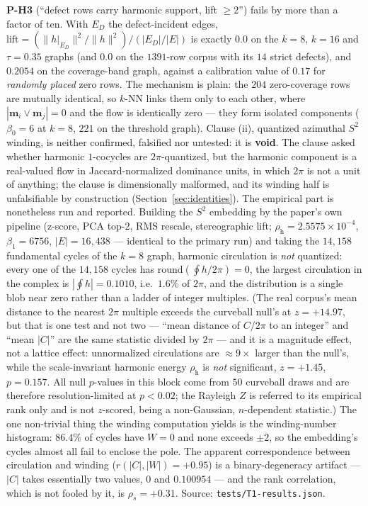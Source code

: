\documentclass[11pt,a4paper]{article}
\theoremstyle{plain}
\theoremstyle{remark}
\theoremstyle{plain}
\begin{document}
\textbf{P-H3} (``defect rows carry harmonic support, lift $\ge2$'') fails by more than a factor of ten. With $E_D$ the defect-incident edges, $\mathrm{lift}=(\|h|_{E_D}\|^2/\|h\|^2)/(|E_D|/|E|)$ is exactly $0.0$ on the $k{=}8$, $k{=}16$ and $\tau{=}0.35$ graphs (and $0.0$ on the $1391$-row corpus with its $14$ strict defects), and $0.2054$ on the coverage-band graph, against a calibration value of $0.17$ for \emph{randomly placed} zero rows. The mechanism is plain: the $204$ zero-coverage rows are mutually identical, so $k$-NN links them only to each other, where $|\mathbf m_i\vee\mathbf m_j|=0$ and the flow is identically zero --- they form isolated components ($\beta_0=6$ at $k{=}8$, $221$ on the threshold graph). Clause (ii), quantized azimuthal $S^2$ winding, is neither confirmed, falsified nor untested: it is \textbf{void}. The clause asked whether harmonic $1$-cocycles are $2\pi$-quantized, but the harmonic component is a real-valued flow in Jaccard-normalized dominance units, in which $2\pi$ is not a unit of anything; the clause is dimensionally malformed, and its winding half is unfalsifiable by construction (Section~\ref{sec:identities}). The empirical part is nonetheless run and reported. Building the $S^2$ embedding by the paper's own pipeline (z-score, PCA top-$2$, RMS rescale, stereographic lift; $\rho_{\mathrm h}=2.5575\times10^{-4}$, $\beta_1=6756$, $|E|=16{,}438$ --- identical to the primary run) and taking the $14{,}158$ fundamental cycles of the $k{=}8$ graph, harmonic circulation is \emph{not} quantized: every one of the $14{,}158$ cycles has $\mathrm{round}(\oint h/2\pi)=0$, the largest circulation in the complex is $|\oint h|=0.1010$, i.e.\ $1.6\%$ of $2\pi$, and the distribution is a single blob near zero rather than a ladder of integer multiples. (The real corpus's mean distance to the nearest $2\pi$ multiple exceeds the curveball null's at $z=+14.97$, but that is one test and not two --- ``mean distance of $C/2\pi$ to an integer'' and ``mean $|C|$'' are the same statistic divided by $2\pi$ --- and it is a magnitude effect, not a lattice effect: unnormalized circulations are $\approx9\times$ larger than the null's, while the scale-invariant harmonic energy $\rho_{\mathrm h}$ is \emph{not} significant, $z=+1.45$, $p=0.157$. All null $p$-values in this block come from $50$ curveball draws and are therefore resolution-limited at $p<0.02$; the Rayleigh $Z$ is referred to its empirical rank only and is not $z$-scored, being a non-Gaussian, $n$-dependent statistic.) The one non-trivial thing the winding computation yields is the winding-number histogram: $86.4\%$ of cycles have $W=0$ and none exceeds $\pm2$, so the embedding's cycles almost all fail to enclose the pole. The apparent correspondence between circulation and winding ($r(|C|,|W|)=+0.95$) is a binary-degeneracy artifact --- $|C|$ takes essentially two values, $0$ and $0.100954$ --- and the rank correlation, which is not fooled by it, is $\rho_s=+0.31$. Source: \texttt{tests/T1-results.json}.
\end{document}
